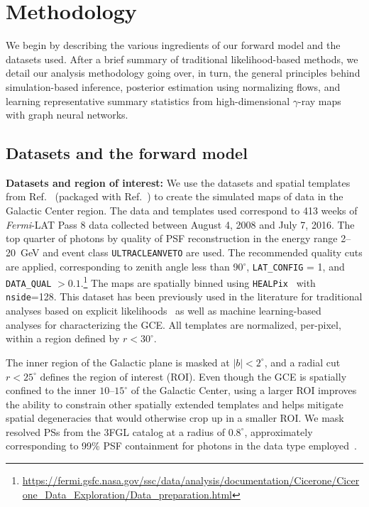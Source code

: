 \documentclass[prd,aps,10pt,nofootinbib,twocolumn,superscriptaddress,preprintnumbers,balancelastpage,longbibliography]{revtex4-1}
\begin{document}
\section{Methodology}
\label{sec:analysis}

We begin by describing the various ingredients of our forward model and the datasets used. After a brief summary of traditional likelihood-based methods, we detail our analysis methodology going over, in turn, the general principles behind simulation-based inference, posterior estimation using normalizing flows, and learning representative summary statistics from high-dimensional $\gamma$-ray maps with graph neural networks.

\subsection{Datasets and the forward model}
\label{sec:datasets}

\noindent
\textbf{Datasets and region of interest:} We use the datasets and spatial templates from Ref.~\cite{rodd_nicholas_safdi_siddharth_2016} (packaged with Ref.~\cite{Mishra-Sharma:2016gis}) to create the simulated maps of \Fermi data in the Galactic Center region. The data and templates used correspond to 413 weeks of \emph{Fermi}-LAT Pass 8 data collected between August 4, 2008 and July 7, 2016. The top quarter of photons by quality of PSF reconstruction in the energy range 2--20~GeV and event class \texttt{ULTRACLEANVETO} are used. The recommended quality cuts are applied, corresponding to zenith angle less than 90$^\circ$, \texttt{LAT\_CONFIG} = 1, and \texttt{DATA\_QUAL} $> 0.1$.\footnote{\url{https://fermi.gsfc.nasa.gov/ssc/data/analysis/documentation/Cicerone/Cicerone_Data_Exploration/Data_preparation.html}} The maps are spatially binned using \texttt{HEALPix}~\cite{Gorski:2004by} with \texttt{nside}=128. This dataset has been previously used in the literature for traditional analyses based on explicit likelihoods~\cite{Buschmann:2020adf,Chang:2019ars,Leane:2019xiy} as well as machine learning-based~\cite{List:2020mzd} analyses for characterizing the GCE. All templates are normalized, per-pixel, within a region defined by $r < 30^\circ$.

The inner region of the Galactic plane is masked at $|b| < 2^\circ$, and a radial cut $r < 25^\circ$ defines the region of interest (ROI). Even though the GCE is spatially confined to the inner $10\mbox{--}15^\circ$ of the Galactic Center, using a larger ROI improves the ability to constrain other spatially extended templates and helps mitigate spatial degeneracies that would otherwise crop up in a smaller ROI. We mask resolved PSs from the 3FGL catalog at a radius of $0.8^\circ$, approximately corresponding to 99\% PSF containment for photons in the data type employed~\cite{Fermi-LAT:2015bhf}. \\
\end{document}
